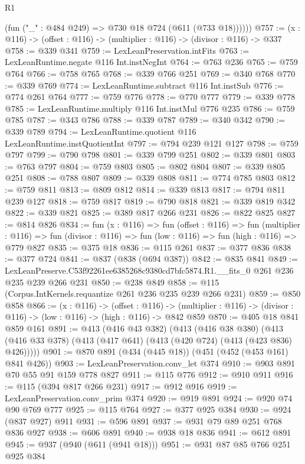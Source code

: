 \begin{lexlean}{R1}
\begin{coremodule}
          (fun ("_" : @484 @249) => @730 @18 @724 (@611 (@733 @18))))))
@757 := (x : @116) -> (offset : @116) -> (multiplier : @116) -> (divisor : @116) -> @337
@758 := @339 @341
@759 := LexLeanPreservation.intFits
@763 := LexLeanRuntime.negate @116 Int.instNegInt
@764 := @763 @236
@765 := @759 @764
@766 := @758 @765
@768 := @339 @766 @251
@769 := @340 @768
@770 := @339 @769
@774 := LexLeanRuntime.subtract @116 Int.instSub
@776 := @774 @261 @764
@777 := @759 @776
@778 := @770 @777
@779 := @339 @778
@785 := LexLeanRuntime.multiply @116 Int.instMul @776 @235
@786 := @759 @785
@787 := @343 @786
@788 := @339 @787
@789 := @340 @342
@790 := @339 @789
@794 := LexLeanRuntime.quotient @116 LexLeanRuntime.instQuotientInt
@797 := @794 @239 @121 @127
@798 := @759 @797
@799 := @790 @798
@801 := @339 @799 @251
@802 := @339 @801
@803 := @763 @797
@804 := @759 @803
@805 := @802 @804
@807 := @339 @805 @251
@808 := @788 @807
@809 := @339 @808
@811 := @774 @785 @803
@812 := @759 @811
@813 := @809 @812
@814 := @339 @813
@817 := @794 @811 @239 @127
@818 := @759 @817
@819 := @790 @818
@821 := @339 @819 @342
@822 := @339 @821
@825 := @389 @817 @266 @231
@826 := @822 @825
@827 := @814 @826
@834 := fun (x : @116) =>
  fun (offset : @116) =>
  fun (multiplier : @116) =>
  fun (divisor : @116) => fun (low : @116) => fun (high : @116) => @779 @827
@835 := @375 @18
@836 := @115 @261
@837 := @377 @836
@838 := @377 @724
@841 := @837 (@838 (@694 @387))
@842 := @835 @841
@849 := LexLeanPreserve.C53f92261ee6385268c9380cd7bfc5874.R1.__fits_0 @261 @236 @235 @239 @266 @231
@850 := @238 @849
@858 := @115 (Corpus.IntKernels.requantize @261 @236 @235 @239 @266 @231)
@859 := @850 @858
@866 := (x : @116) ->
  (offset : @116) ->
  (multiplier : @116) -> (divisor : @116) -> (low : @116) -> (high : @116) -> @842 @859
@870 := @405 @18 @841 @859 @161
@891 := @413
    (@416 @43 @382)
    (@413
      (@416 @38 @380)
      (@413 (@416 @33 @378) (@413 (@417 @641) (@413 (@420 @724) (@413 (@423 @836) @426)))))
@901 := @870 @891 (@434 (@445 @18)) (@451 (@452 (@453 @161) @841 @426))
@903 := LexLeanPreservation.conv_let @374
@910 := @903 @891 @70 @55 @91 @159 @778 @827
@911 := @115 @776
@912 := @910 @911
@916 := @115 (@394 @817 @266 @231)
@917 := @912 @916
@919 := LexLeanPreservation.conv_prim @374
@920 := @919 @891
@924 := @920 @74 @90 @769 @777
@925 := @115 @764
@927 := @377 @925 @384
@930 := @924 (@837 @927) @911
@931 := @596 @891
@937 := @931 @79 @89 @251 @768 @836 @927
@938 := @606 @891
@940 := @938 @18 @836
@941 := @612 @891
@945 := @937 (@940 (@611 (@941 @18)))
@951 := @931 @87 @85 @766 @251 @925 @384

\end{coremodule}
\end{lexlean}
